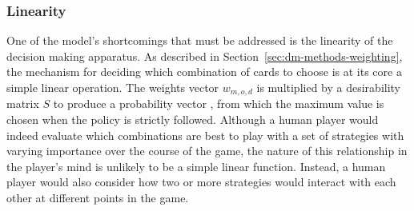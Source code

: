 
\subsubsection*{Linearity}
\label{sec:disc-shortcomings-linearity}


One of the model's shortcomings that must be addressed is the linearity
of the decision making apparatus.
%
As described in Section~\ref{sec:dm-methods-weighting},
the mechanism for deciding which combination of cards to choose is\textemdash
at its core\textemdash
a simple linear operation.
%
The weights vector $w_{m,o,d}$ is multiplied by a desirability matrix $S$
to produce a probability vector \pvec,
from which the maximum value is chosen when the policy is strictly followed.
%
Although a human player would indeed evaluate which combinations are best
to play with a set of strategies with varying importance over the course
of the game,
the nature of this relationship in the player's mind is unlikely
to be a simple linear function.
%
Instead,
a human player would also consider how two or more strategies would interact
with each other at different points in the game.

